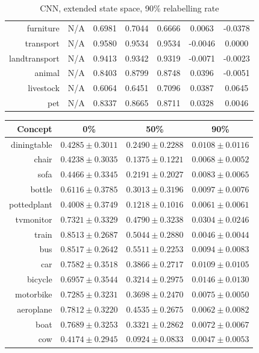 \documentclass[11pt,a4paper]{article}
\begin{document}
\begin{table}[htbp]
\begin{tabular}{r|c|c|c|c|c|c}
furniture     & N/A    & 0.6981 & 0.7044 & 0.6666 & 0.0063 & -0.0378\\
transport     & N/A    & 0.9580 & 0.9534 & 0.9534 & -0.0046 & 0.0000\\
landtransport & N/A    & 0.9413 & 0.9342 & 0.9319 & -0.0071 & -0.0023\\
animal        & N/A    & 0.8403 & 0.8799 & 0.8748 & 0.0396 & -0.0051\\
livestock     & N/A    & 0.6064 & 0.6451 & 0.7096 & 0.0387 & 0.0645\\
pet           & N/A    & 0.8337 & 0.8665 & 0.8711 & 0.0328 & 0.0046
\end{tabular}
\caption{CNN, extended state space, 90\% relabelling rate}
\label{tab:cnn90acc}
\end{table}

\begin{table}[htbp]
\centering
\begin{tabular}{r|c|c|c}
Concept & 0\% & 50\% & 90\%\\\hline
diningtable   & $0.4285\pm0.3011$ & $0.2490\pm0.2288$ & $0.0108\pm0.0116$\\
chair         & $0.4238\pm0.3035$ & $0.1375\pm0.1221$ & $0.0068\pm0.0052$\\
sofa          & $0.4466\pm0.3345$ & $0.2191\pm0.2027$ & $0.0083\pm0.0065$\\
bottle        & $0.6116\pm0.3785$ & $0.3013\pm0.3196$ & $0.0097\pm0.0076$\\
pottedplant   & $0.4008\pm0.3749$ & $0.1218\pm0.1016$ & $0.0061\pm0.0061$\\
tvmonitor     & $0.7321\pm0.3329$ & $0.4790\pm0.3238$ & $0.0304\pm0.0246$\\
train         & $0.8513\pm0.2687$ & $0.5044\pm0.2880$ & $0.0046\pm0.0044$\\
bus           & $0.8517\pm0.2642$ & $0.5511\pm0.2253$ & $0.0094\pm0.0083$\\
car           & $0.7582\pm0.3518$ & $0.3866\pm0.2717$ & $0.0109\pm0.0105$\\
bicycle       & $0.6957\pm0.3544$ & $0.3214\pm0.2975$ & $0.0146\pm0.0130$\\
motorbike     & $0.7285\pm0.3231$ & $0.3698\pm0.2470$ & $0.0075\pm0.0050$\\
aeroplane     & $0.7812\pm0.3220$ & $0.4535\pm0.2675$ & $0.0062\pm0.0082$\\
boat          & $0.7689\pm0.3253$ & $0.3321\pm0.2862$ & $0.0072\pm0.0067$\\
cow           & $0.4174\pm0.2945$ & $0.0924\pm0.0833$ & $0.0047\pm0.0053$\\

\end{tabular}
\end{table}
\end{document}
